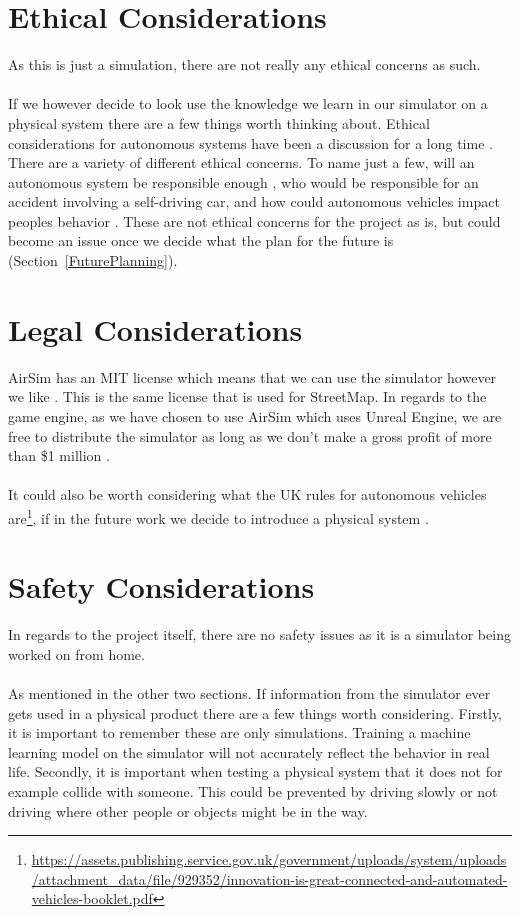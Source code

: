 \section{Ethical Considerations}
As this is just a simulation, there are not really any ethical concerns as such. 
\\~\\
If we however decide to look use the knowledge we learn in our simulator on a physical system there are a few things worth thinking about. Ethical considerations for autonomous systems have been a discussion for a long time \cite{ArkinRonaldC2016EaAS, BorensteinJason2019SCaE}. There are a variety of different ethical concerns. To name just a few, will an autonomous system be responsible enough \cite{BorensteinJason2019SCaE}, who would be responsible for an accident involving a self-driving car, and how could autonomous vehicles impact peoples behavior \cite{moralComputers}. These are not ethical concerns for the project as is, but could become an issue once we decide what the plan for the future is (Section~\ref{FuturePlanning}). 

\section{Legal Considerations}
AirSim has an MIT license which means that we can use the simulator however we like \cite{MITLicense}. This is the same license that is used for StreetMap. In regards to the game engine, as we have chosen to use AirSim which uses Unreal Engine, we are free to distribute the simulator as long as we don't make a gross profit of more than \$1 million \cite{UE5}. 
\\~\\
It could also be worth considering what the UK rules for autonomous vehicles are\footnote{\url{https://assets.publishing.service.gov.uk/government/uploads/system/uploads/attachment_data/file/929352/innovation-is-great-connected-and-automated-vehicles-booklet.pdf}}, if in the future work we decide to introduce a physical system \cite{UKAutoRules, UKAutoRulesGov2}. 


\section{Safety Considerations}
In regards to the project itself, there are no safety issues as it is a simulator being worked on from home. 
\\~\\
As mentioned in the other two sections. If information from the simulator ever gets used in a physical product there are a few things worth considering. Firstly, it is important to remember these are only simulations. Training a machine learning model on the simulator will not accurately reflect the behavior in real life. Secondly, it is important when testing a physical system that it does not for example collide with someone. This could be prevented by driving slowly or not driving where other people or objects might be in the way.